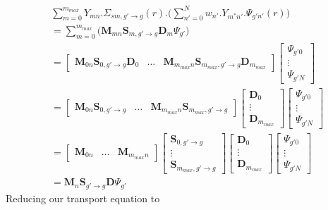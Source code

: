 \documentclass[11pt,letterpaper,titlepage]{article}
\numberwithin{equation}{section}
\begin{document}
\begin{align*}
&\sum_{m=0}^{m_{max}}
Y_{mn}
. 
\Sigma_{sm,g'{\to}g} (r)
. \biggr(
\sum_{n'=0}^{N} w_{n'} . Y_{m^*n'}.\Psi_{g'n'}(r) 
\biggr)\\
&=\sum_{m=0}^{m_{max}}\biggr(\mathbf{M}_{mn}\mathbf{S}_{m,g'{\to}g} \mathbf{D}_m\Psi_{g'}\biggr)
\\
&=
\begin{bmatrix}
\mathbf{M}_{0n}\mathbf{S}_{0,g'{\to}g} \mathbf{D}_0
&\hdots
&\mathbf{M}_{m_{max}n}\mathbf{S}_{m_{max},g'{\to}g} \mathbf{D}_{m_{max}}
\end{bmatrix}
\begin{bmatrix}
\Psi_{g'0} \\
\vdots    \\
\Psi_{g'N}
\end{bmatrix}
\\
&=
\begin{bmatrix}
\mathbf{M}_{0n}\mathbf{S}_{0,g'{\to}g} 
&\hdots
&\mathbf{M}_{m_{max}n}\mathbf{S}_{m_{max},g'{\to}g} 
\end{bmatrix}
\begin{bmatrix}
\mathbf{D}_0 \\
\vdots    \\
\mathbf{D}_{m_{max}}
\end{bmatrix}
\begin{bmatrix}
\Psi_{g'0} \\
\vdots    \\
\Psi_{g'N}
\end{bmatrix}
\\
&=
\begin{bmatrix}
\mathbf{M}_{0n}
&\hdots
&\mathbf{M}_{m_{max}n}
\end{bmatrix}
\begin{bmatrix}
\mathbf{S}_{0,g'{\to}g} \\
\vdots    \\
\mathbf{S}_{m_{max},g'{\to}g} 
\end{bmatrix}
\begin{bmatrix}
\mathbf{D}_0 \\
\vdots    \\
\mathbf{D}_{m_{max}}
\end{bmatrix}
\begin{bmatrix}
\Psi_{g'0} \\
\vdots    \\
\Psi_{g'N}
\end{bmatrix}
\\
&=\mathbf{M}_n \mathbf{S}_{g'{\to}g} \mathbf{D} \Psi_{g'}
\end{align*}
\newline
Reducing our transport equation to
\end{document}
